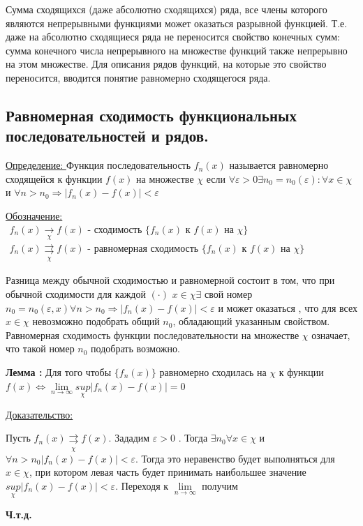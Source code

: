 \documentclass[12pt]{article}
\newcommand*\circled[1]{\tikz[baseline=(char.base)]{
    \node[shape=circle, draw, inner sep=1pt, 
        minimum height=12pt] (char) {#1};}}
\let\oldlim\lim
\renewcommand{\lim}{\oldlim\limits}
\begin{document}
\begin{enumerate}
    Сумма сходящихся (даже абсолютно сходящихся) ряда, все члены которого являются непрерывными функциями
    может оказаться разрывной функцией. Т.е. даже на абсолютно сходящиеся ряда не переносится свойство конечных
    сумм: сумма конечного числа непрерывного на множестве функций также непрерывно на этом множестве.
    Для описания рядов функций, на которые это свойство переносится, вводится понятие равномерно сходящегося
    ряда.
  \end{enumerate}
  

  \subsection{Равномерная сходимость функциональных последовательностей и рядов.}
  \underline{Определение: } Функция последовательность $f_n(x)$ называется равномерно сходящейся к функции 
  $f(x)$ на множестве $\chi$ если $\forall \varepsilon > 0 \exists n_0=n_0(\varepsilon): \forall x \in \chi$ и 
  $\forall n > n_0 \Rightarrow |f_n(x)-f(x)| <\varepsilon$

  \underline{Обозначение: }
  $\begin{matrix}
    f_n(x) \underset{\chi}{\rightarrow} f(x) \text{ - сходимость } \{f_n(x) \text{ к } f(x) \text{ на } \chi\}\\
    f_n(x) \underset{\chi}{\rightrightarrows} f(x) \text{ - равномерная сходимость } \{f_n(x) \text{ к } f(x) \text{ на } \chi\}
  \end{matrix}$

  Разница между обычной сходимостью и равномерной состоит в том, что при обычной сходимости для каждой $(\cdot)$
  $x \in \chi \exists$ свой номер $n_0=n_0(\varepsilon,x)\forall n>n_0 \Rightarrow |f_n(x)-f(x)|<\varepsilon$ и может оказаться
  , что для всех $x \in \chi$ невозможно подобрать общий $n_0$, обладающий указанным свойством.
  Равномерная сходимость функции последовательности на множестве $\chi$ означает, что такой номер 
  $n_0$ подобрать возможно.
  
  \textbf{Лемма :} Для того чтобы $\{f_n(x)\}$ равномерно сходилась на $\chi$ к функции $f(x) \Leftrightarrow
  \lim_{n \to \infty} \underset{\chi}{sup}|f_n(x)-f(x)|=0$
  
  \underline{Доказательство:}
  \begin{adjustwidth}{1.5em}{1.5em}
    \circled{$\Rightarrow$} Пусть $f_n(x) \underset{\chi}{\rightrightarrows} f(x)$. Зададим $\varepsilon > 0$
    . Тогда $\exists n_0 \forall x \in \chi$ и $\forall n>n_0 |f_n(x) - f(x)|<\varepsilon.$ Тогда это неравенство
    будет выполняться для $x \in \chi$, при котором левая часть будет принимать наибольшее значение
    $\underset{\chi}{sup}|f_n(x)-f(x)|<\varepsilon.$ Переходя к $\lim_{n \to \infty}$ получим
  \end{adjustwidth}
  \begin{center}
    \textbf{Ч.т.д.}
  \end{center}
\end{document}
